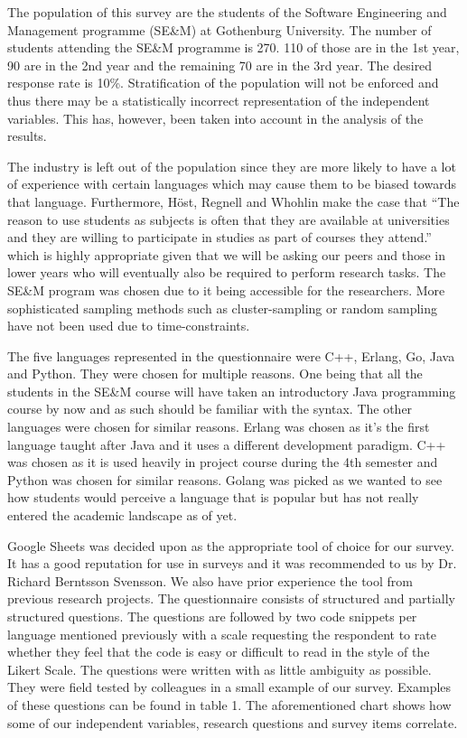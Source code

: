 \documentclass[times, 10pt,twocolumn]{IEEEtran}
\begin{document}
The population of this survey are the students of the Software Engineering and Management programme (SE\&M) at Gothenburg University. The number of students attending the SE\&M programme is 270. 110 of those are in the 1st year, 90 are in the 2nd year and the remaining 70 are in the 3rd year. The desired response rate is 10\%. Stratification of the population will not be enforced and thus there may be a statistically incorrect representation of the independent variables. This has, however, been taken into account in the analysis of the results. 
\newline

The industry is left out of the population since they are more likely to have a lot of experience with certain languages which may cause them to be biased towards that language. Furthermore, Höst, Regnell and Whohlin \cite{host2000using} make the case that ``The reason to use students as subjects is often that they are available at universities and they are willing to participate in studies as part of courses they attend.'' which is highly appropriate given that we will be asking our peers and those in lower years who will eventually also be required to perform research tasks. The SE\&M program was chosen due to it being accessible for the researchers. More sophisticated sampling methods such as cluster-sampling or random sampling have not been used due to time-constraints. 



The five languages represented in the questionnaire were C++, Erlang, Go, Java and Python. They were chosen for multiple reasons. One being that all the students in the SE\&M course will have taken an introductory Java programming course by now and as such should be familiar with the syntax. The other languages were chosen for similar reasons. Erlang was chosen as it's the first language taught after Java and it uses a different development paradigm. C++ was chosen as it is used heavily in project course during the 4th semester and Python was chosen for similar reasons. Golang was picked as we wanted to see how students would perceive a language that is popular but has not really entered the academic landscape as of yet.
\newline

Google Sheets was decided upon as the appropriate tool of choice for our survey. It has a good reputation for use in surveys and it was recommended to us by Dr. Richard Berntsson Svensson. We also have prior experience the tool from previous research projects.
The questionnaire consists of structured and partially structured questions. The questions are followed by two code snippets per language mentioned previously with a scale requesting the respondent to rate whether they feel that the code is easy or difficult to read in the style of the Likert Scale. The questions were written with as little ambiguity as possible. They were field tested by colleagues in a small example of our survey. Examples of these questions can be found in table 1. The aforementioned chart shows how some of our independent variables, research questions and survey items correlate.
\newline
\end{document}
